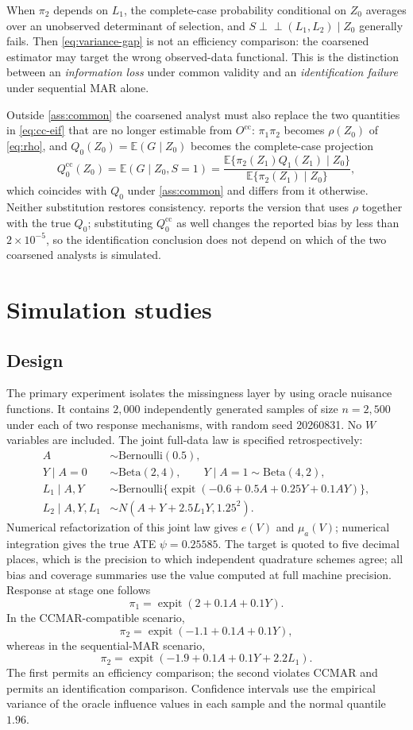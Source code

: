 \documentclass[11pt]{article}
\theoremstyle{definition}
\newcommand{\E}{\mathbb{E}}
\newcommand{\indep}{\perp\!\!\!\perp}
\newcommand{\expit}{\operatorname{expit}}
\newcommand{\1}{\mathbf{1}}
\newcommand{\cc}{\mathrm{cc}}
\begin{document}
When $\pi_2$ depends on $L_1$, the complete-case probability conditional on $Z_0$
averages over an unobserved determinant of selection, and $S\indep(L_1,L_2)\mid Z_0$
generally fails. Then \cref{eq:variance-gap} is not an efficiency comparison:
the coarsened estimator may target the wrong observed-data functional. This is
the distinction between an \emph{information loss} under common validity and an
\emph{identification failure} under sequential MAR alone.

Outside \cref{ass:common} the coarsened analyst must also replace the two
quantities in \cref{eq:cc-eif} that are no longer estimable from $O^{\cc}$:
$\pi_1\pi_2$ becomes $\rho(Z_0)$ of \cref{eq:rho}, and $Q_0(Z_0)=\E(G\mid Z_0)$
becomes the complete-case projection
\[
Q_0^{\cc}(Z_0)=\E(G\mid Z_0,S=1)
=\frac{\E\{\pi_2(Z_1)Q_1(Z_1)\mid Z_0\}}{\E\{\pi_2(Z_1)\mid Z_0\}},
\]
which coincides with $Q_0$ under \cref{ass:common} and differs from it otherwise.
Neither substitution restores consistency.  reports the version
that uses $\rho$ together with the true $Q_0$; substituting $Q_0^{\cc}$ as well
changes the reported bias by less than $2\times10^{-5}$, so the identification
conclusion does not depend on which of the two coarsened analysts is simulated.

\section{Simulation studies}\label{sec:sim}

\subsection{Design}

The primary experiment isolates the missingness layer by using oracle nuisance functions. It contains $2{,}000$ independently generated samples of size $n=2{,}500$ under each of two response mechanisms, with random seed 20260831. No $W$ variables are included. The joint full-data law is specified retrospectively:
\begin{align*}
A&\sim\mathrm{Bernoulli}(0.5),\\
Y\mid A=0&\sim\mathrm{Beta}(2,4),\qquad
Y\mid A=1\sim\mathrm{Beta}(4,2),\\
L_1\mid A,Y&\sim\mathrm{Bernoulli}\{\expit(-0.6+0.5A+0.25Y+0.1AY)\},\\
L_2\mid A,Y,L_1&\sim N(A+Y+2.5L_1Y,1.25^2).
\end{align*}
Numerical refactorization of this joint law gives $e(V)$ and $\mu_a(V)$;
numerical integration gives the true ATE $\psi=0.25585$. The target is quoted to
five decimal places, which is the precision to which independent quadrature
schemes agree; all bias and coverage summaries use the value computed at full
machine precision. Response at stage one follows
\[
\pi_1=\expit(2+0.1A+0.1Y).
\]
In the CCMAR-compatible scenario,
\[
\pi_2=\expit(-1.1+0.1A+0.1Y),
\]
whereas in the sequential-MAR scenario,
\[
\pi_2=\expit(-1.9+0.1A+0.1Y+2.2L_1).
\]
The first permits an efficiency comparison; the second violates CCMAR and
permits an identification comparison. Confidence intervals use the empirical
variance of the oracle influence values in each sample and the normal quantile
$1.96$.
\end{document}
